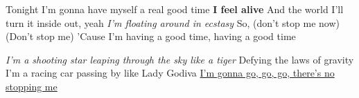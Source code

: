 \par
\begin{flushleft}
    Tonight I'm gonna have myself a real good time
\textbf{I feel alive}
And the world I'll turn it inside out, yeah
\textit{I'm floating around in ecstasy}
So, (don't stop me now)
(Don't stop me)
'Cause I'm having a good time, having a good time
\end{flushleft}


\begin{center}
\par
    \emph{I'm a shooting star leaping through the sky like a tiger}
Defying the laws of gravity
I'm a racing car passing by like Lady Godiva
\underline{I'm gonna go, go, go, there's no stopping me}

\end{center}







